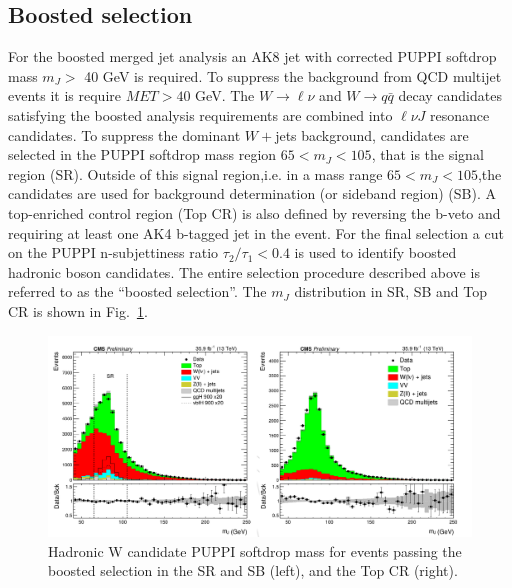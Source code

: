 \subsection*{Boosted selection}
For the boosted merged jet analysis an AK8 jet with corrected PUPPI softdrop mass $m_J >$ 40 GeV is required.
To suppress the background from QCD multijet events it is require $MET>40$ GeV.
The $W \to \ell \nu$ and $W \to q \bar{q}$ decay candidates satisfying the boosted analysis requirements are combined into $\ell \nu J$ resonance candidates.
To suppress the dominant $W+$jets background, candidates are selected in the PUPPI softdrop mass region  $65<m_J < 105$, that is the signal region (SR).
Outside of this signal region,i.e. in a mass range  $65<m_J < 105$,the candidates are used for background determination (or sideband region) (SB).
A top-enriched control region (Top CR) is also defined by reversing the b-veto and requiring at least one AK4
b-tagged jet in the event.
For the final selection a cut on the PUPPI n-subjettiness ratio $\tau_2 /\tau_1<0.4$ is used to identify boosted
hadronic boson candidates. The entire selection procedure described above is referred to as the ``boosted selection''.
The $m_J$ distribution in SR, SB and Top CR is shown in Fig.~\ref{mJ}.
\begin{figure}
\centering
\includegraphics[scale= 0.8]{../Cap5/mJ}
\caption{Hadronic W candidate PUPPI softdrop mass for events passing
the boosted selection in the SR and SB (left), and the Top CR (right).}
\label{mJ}
\end{figure}

